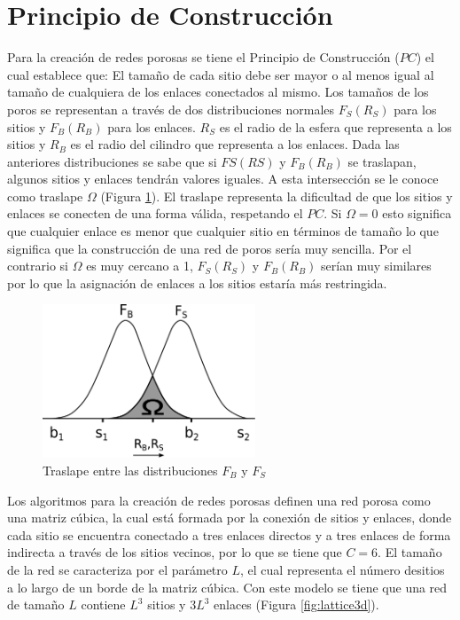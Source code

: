 \section{Principio de Construcción}
Para la creación de redes porosas se tiene el Principio de Construcción ($PC$) el cual establece que: El tamaño de cada sitio debe ser mayor o al menos igual al tamaño de cualquiera de los enlaces conectados al mismo. Los tamaños de los poros se representan a través de dos distribuciones normales $F_S(R_S)$ para los sitios y $F_B(R_B)$ para los enlaces. $R_S$ es el radio de la esfera que representa a los sitios y $R_B$ es el radio del cilindro que representa a los enlaces. Dada las anteriores distribuciones se sabe que si $FS(RS)$ y $F_B(R_B)$ se traslapan, algunos sitios y enlaces tendrán valores iguales. A esta intersección se le conoce como traslape $\Omega$ (Figura \ref{fig:overlap}). El traslape representa la dificultad de que los sitios y enlaces se conecten de una forma válida, respetando el $PC$. Si $\Omega=0$ esto significa que cualquier enlace es menor que cualquier sitio en términos de tamaño lo que significa que la construcción de una red de poros sería muy sencilla. Por el contrario si $\Omega$ es muy cercano a 1, $F_S(R_S)$ y $F_B(R_B)$ serían muy similares por lo que la asignación de enlaces a los sitios estaría más restringida.\\


\begin{figure}[hbtp]
\centering
\includegraphics[width=2.5in]{img/traslape.pdf}
\caption{Traslape entre las distribuciones \textit{$F_B$} y $F_S$}
\label{fig:overlap}
\end{figure}

Los algoritmos para la creación de redes porosas definen una red porosa como una matriz cúbica, la cual está formada por la conexión de sitios y enlaces, donde cada sitio se encuentra conectado a tres enlaces directos y a tres enlaces de forma indirecta a través de los sitios vecinos, por lo que se tiene que $C=6$. El tamaño de la red se caracteriza por el parámetro $L$, el cual representa el número desitios a lo largo de un borde de la matriz cúbica. Con este modelo se tiene que una red de tamaño $L$ contiene $L^3$ sitios y $3L^3$ enlaces (Figura \ref{fig:lattice3d}).

